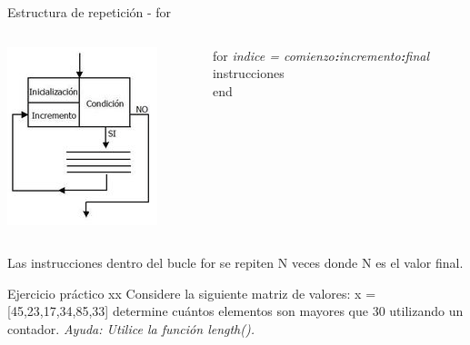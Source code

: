 \documentclass{bredelebeamer}
\begin{document}
\begin{frame}{Estructura de repetición - for}
\begin{columns}
\begin{column}{0.5\textwidth}
\begin{center}
\includegraphics[scale=0.7]{images/pantalla8.png}
\end{center}
\end{column}
\begin{column}{0.3\textwidth}
for \textit{indice = comienzo\textbf{:}incremento\textbf{:}final}\\
   instrucciones\\
end
\end{column}
\end{columns}
\begin{center}
Las instrucciones dentro del bucle for se repiten N veces donde N es el valor final.
\end{center}
\end{frame}

\begin{frame}{Ejercicio práctico xx}
Considere la siguiente matriz de valores: x = [45,23,17,34,85,33] determine cuántos elementos son mayores que 30 utilizando un contador. \textit{Ayuda: Utilice la función length().}
\end{frame}
\end{document}

